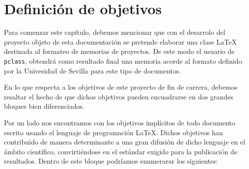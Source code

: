 \chapter{Definici\'on de objetivos}\label{defobjetivos}
	Para comenzar este cap\'itulo, debemos mencionar que con el desarrolo del proyecto objeto de esta 
	documentaci\'on se pretende elaborar una clase \LaTeX{} destinada al formateo de memorias de proyectos. De este modo
	el usuario de \texttt{pclass}, obtendr\'a como resultado final una memoria acorde al formato definido por la 
	Univesidad de Sevilla para este tipo de documentos.

	En lo que respecta a los objetivos de este proyecto de fin de carrera, debemos resaltar el hecho 
	de que dichos objetivos pueden encuadrarse en dos grandes bloques bien diferenciados. 
	
	Por un lado nos encontramos con los objetivos impl\'icitos de todo documento escrito usando el lenguaje de 
	programaci\'on \LaTeX{}. Dichos objetivos han contribuido de manera determinante a una gran difusi\'on de dicho lenguaje en 
	el \'ambito cient\'ifico, convirti\'endose en el est\'andar exigido para la publicaci\'on de resultados. Dentro de este 
	bloque podr\'iamos enumerarar los siguientes:
	
